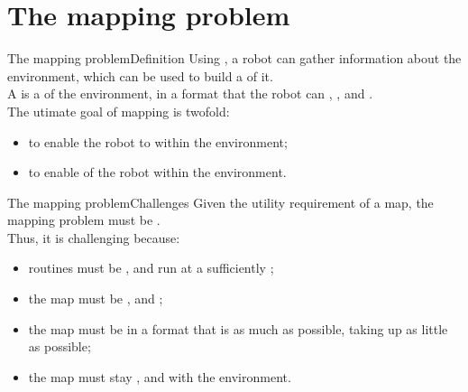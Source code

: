
\section{The mapping problem}
\graphicspath{{figs/section2/}}

\begin{frame}{The mapping problem}{Definition}
  Using , a robot can gather information about the environment, which can be used to build a  of it.\\
  \bigskip
  A  is a  of the environment, in a format that the robot can , , and .\\
  \bigskip
  The utimate goal of mapping is twofold:
  \begin{itemize}
    \item to enable the robot to  within the environment;
    \item to enable  of the robot within the environment.
  \end{itemize}
\end{frame}
\begin{frame}{The mapping problem}{Challenges}
  Given the utility requirement of a map, the mapping problem must be .\\
  \medskip
  Thus, it is challenging because:
  \begin{itemize}
    \item routines must be , and run at a sufficiently ;
    \item the map must be , and ;
    \item the map must be in a format that is as much  as possible, taking up as little  as possible;
    \item the map must stay , and  with the environment.
  \end{itemize}
\end{frame}
